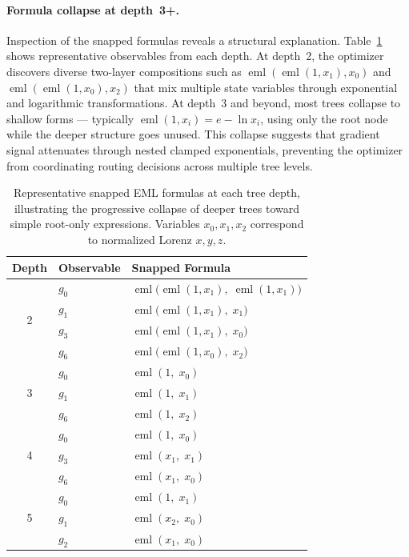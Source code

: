 \documentclass[11pt]{article}
\DeclareMathOperator{\eml}{eml}
\begin{document}
\paragraph{Formula collapse at depth~3+.}
Inspection of the snapped formulas reveals a structural explanation.
Table~\ref{tab:depth-formulas} shows representative observables from each depth.
At depth~2, the optimizer discovers diverse two-layer compositions such as
$\eml(\eml(1, x_1), x_0)$ and $\eml(\eml(1, x_0), x_2)$ that mix multiple
state variables through exponential and logarithmic transformations.  At depth~3
and beyond, most trees collapse to shallow forms --- typically
$\eml(1, x_i) = e - \ln x_i$, using only the root node while the deeper
structure goes unused.  This collapse suggests that gradient signal attenuates
through nested clamped exponentials, preventing the optimizer from coordinating
routing decisions across multiple tree levels.

\begin{table}[t]
\centering
\caption{Representative snapped EML formulas at each tree depth, illustrating
  the progressive collapse of deeper trees toward simple root-only expressions.
  Variables $x_0, x_1, x_2$ correspond to normalized Lorenz $x, y, z$.}
\label{tab:depth-formulas}
\begin{tabular}{clp{7.2cm}}
\toprule
Depth & Observable & Snapped Formula \\
\midrule
\multirow{4}{*}{2}
  & $g_0$ & $\eml\bigl(\eml(1, x_1),\; \eml(1, x_1)\bigr)$ \\
  & $g_1$ & $\eml\bigl(\eml(1, x_1),\; x_1\bigr)$ \\
  & $g_3$ & $\eml\bigl(\eml(1, x_1),\; x_0\bigr)$ \\
  & $g_6$ & $\eml\bigl(\eml(1, x_0),\; x_2\bigr)$ \\
\midrule
\multirow{3}{*}{3}
  & $g_0$ & $\eml(1,\; x_0)$ \\
  & $g_1$ & $\eml(1,\; x_1)$ \\
  & $g_6$ & $\eml(1,\; x_2)$ \\
\midrule
\multirow{3}{*}{4}
  & $g_0$ & $\eml(1,\; x_0)$ \\
  & $g_3$ & $\eml(x_1,\; x_1)$ \\
  & $g_6$ & $\eml(x_1,\; x_0)$ \\
\midrule
\multirow{3}{*}{5}
  & $g_0$ & $\eml(1,\; x_1)$ \\
  & $g_1$ & $\eml(x_2,\; x_0)$ \\
  & $g_2$ & $\eml(x_1,\; x_0)$ \\
\bottomrule
\end{tabular}
\end{table}
\end{document}
